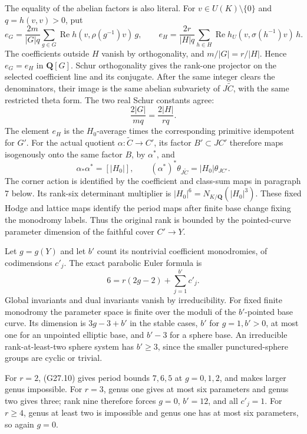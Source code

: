 The equality of the abelian factors is also literal.
For \(v\in U(K)\setminus\{0\}\) and \(q=h(v,v)>0\), put
\[
 e_G=\frac{2m}{|G|q}\sum_{g\in G}
        \operatorname{Re}h(v,\rho(g^{-1})v)\,g,\qquad
 e_H=\frac{2r}{|H|q}\sum_{h\in H}
        \operatorname{Re}h_U(v,\sigma(h^{-1})v)\,h .
                                                               \tag{G27.7}
\]
The coefficients outside \(H\) vanish by orthogonality, and
\(m/|G|=r/|H|\). Hence \(e_G=e_H\) in \(\mathbf Q[G]\).
Schur orthogonality gives the rank-one projector on the selected
coefficient line and its conjugate. After the same integer clears
the denominators, their image is the same abelian subvariety
of \(J\widetilde C\), with the same restricted theta form.
The two real Schur constants agree:
\[
                    \frac{2|G|}{mq}=\frac{2|H|}{rq}.          \tag{G27.8}
\]
The element \(e_H\) is the \(H_0\)-average times the corresponding
primitive idempotent for \(G'\). For the actual quotient
\(\alpha:\widetilde C\to C'\), its factor \(B'\subset JC'\)
therefore maps isogenously onto the same factor \(B\), by
\(\alpha^*\), and
\[
 \alpha_*\alpha^*=[|H_0|],\qquad
       (\alpha^*)^*\theta_{J\widetilde C}=|H_0|\theta_{JC'}.
                                                               \tag{G27.9}
\]
The corner action is identified by the coefficient and class-sum
maps in paragraph 7 below. Its rank-six determinant multiplier is
\(|H_0|^6=N_{K/\mathbf Q}(|H_0|^3)\).
These fixed Hodge and lattice maps identify the period maps after
finite base change fixing the monodromy labels. Thus the original
rank is bounded by the pointed-curve parameter dimension of
the faithful cover \(C'\to Y\).

Let \(g=g(Y)\) and let \(b'\) count its nontrivial coefficient
monodromies, of codimensions \(c'_j\). The exact parabolic Euler
formula is
\[
                    6=r(2g-2)+\sum_{j=1}^{b'}c'_j.           \tag{G27.10}
\]
Global invariants and dual invariants vanish by irreducibility.
For fixed finite monodromy the parameter space is finite over
the moduli of the \(b'\)-pointed base curve. Its dimension is
\(3g-3+b'\) in the stable cases, \(b'\) for \(g=1,b'>0\),
at most one for an unpointed elliptic base, and \(b'-3\)
for a sphere base. An irreducible rank-at-least-two sphere
system has \(b'\ge3\), since the smaller punctured-sphere
groups are cyclic or trivial.

For \(r=2\), (G27.10) gives period bounds \(7,6,5\) at
\(g=0,1,2\), and makes larger genus impossible.
For \(r=3\), genus one gives at most six parameters and
genus two gives three; rank nine therefore forces \(g=0\),
\(b'=12\), and all \(c'_j=1\).
For \(r\ge4\), genus at least two is impossible and genus one
has at most six parameters, so again \(g=0\).

